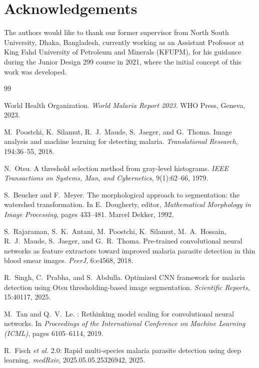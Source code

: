 \documentclass[10pt,twocolumn]{article}
\newcommand{\etal}{\textit{et al.}}
\begin{document}
\section*{Acknowledgements}
The authors would like to thank our former supervisor from North South University, Dhaka, Bangladesh, currently working as an Assistant Professor at King Fahd University of Petroleum and Minerals (KFUPM), for his guidance during the Junior Design 299 course in 2021, where the initial concept of this work was developed.

\begin{thebibliography}{99}

World Health Organization.
\newblock \textit{World Malaria Report 2023}.
\newblock WHO Press, Geneva, 2023.

M.~Poostchi, K.~Silamut, R.~J.~Maude, S.~Jaeger, and G.~Thoma.
\newblock Image analysis and machine learning for detecting malaria.
\newblock \textit{Translational Research}, 194:36--55, 2018.

N.~Otsu.
\newblock A threshold selection method from gray-level histograms.
\newblock \textit{IEEE Transactions on Systems, Man, and Cybernetics},
  9(1):62--66, 1979.

S.~Beucher and F.~Meyer.
\newblock The morphological approach to segmentation: the watershed
  transformation.
\newblock In E.~Dougherty, editor, \textit{Mathematical Morphology in Image
  Processing}, pages 433--481. Marcel Dekker, 1992.

S.~Rajaraman, S.~K.~Antani, M.~Poostchi, K.~Silamut, M.~A.~Hossain,
  R.~J.~Maude, S.~Jaeger, and G.~R.~Thoma.
\newblock Pre-trained convolutional neural networks as feature extractors
  toward improved malaria parasite detection in thin blood smear images.
\newblock \textit{PeerJ}, 6:e4568, 2018.

R.~Singh, C.~Prabha, and S.~Abdulla.
\newblock Optimized {CNN} framework for malaria detection using
  {Otsu} thresholding-based image segmentation.
\newblock \textit{Scientific Reports}, 15:40117, 2025.

M.~Tan and Q.~V.~Le.
: Rethinking model scaling for convolutional neural
  networks.
\newblock In \textit{Proceedings of the International Conference on Machine
  Learning (ICML)}, pages 6105--6114, 2019.

R.~Fisch \etal
{} 2.0: Rapid multi-species malaria parasite detection
  using deep learning.
\newblock \textit{medRxiv}, 2025.05.05.25326942, 2025.


\end{thebibliography}
\end{document}

